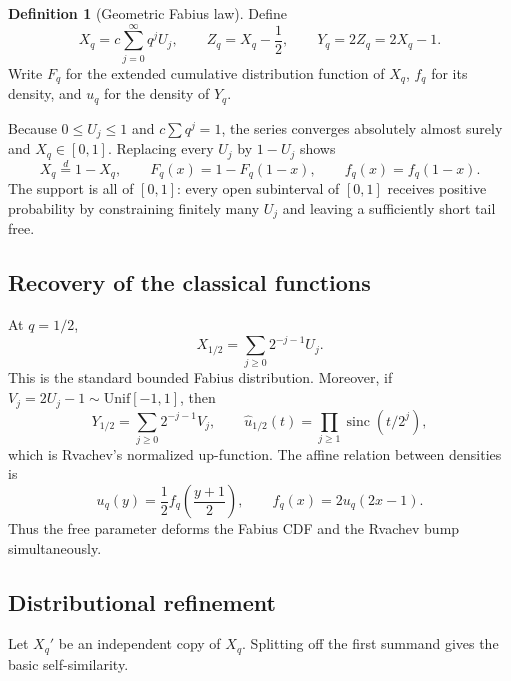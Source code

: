 \documentclass[11pt,oneside]{article}
\theoremstyle{definition}
\newtheorem{definition}[theorem]{Definition}
\theoremstyle{remark}
\newcommand{\sinc}{\operatorname{sinc}}
\begin{document}
\begin{definition}[Geometric Fabius law]
\label{def:qfabius}
Define
\begin{equation}
 X_q=c\sum_{j=0}^{\infty}q^jU_j,
 \qquad
 Z_q=X_q-\frac12,
 \qquad
 Y_q=2Z_q=2X_q-1.                         \label{eq:q-law}
\end{equation}
Write $F_q$ for the extended cumulative distribution function of $X_q$,
$f_q$ for its density, and $u_q$ for the density of $Y_q$.
\end{definition}

Because $0\le U_j\le1$ and $c\sum q^j=1$, the series converges absolutely almost surely and
$X_q\in[0,1]$.  Replacing every $U_j$ by $1-U_j$ shows
\begin{equation}
 X_q\overset d=1-X_q,
 \qquad F_q(x)=1-F_q(1-x),
 \qquad f_q(x)=f_q(1-x).                   \label{eq:symmetry}
\end{equation}
The support is all of $[0,1]$: every open subinterval of $[0,1]$ receives positive
probability by constraining finitely many $U_j$ and leaving a sufficiently short tail free.

\subsection{Recovery of the classical functions}

At $q=1/2$,
\[
 X_{1/2}=\sum_{j\ge0}2^{-j-1}U_j.
\]
This is the standard bounded Fabius distribution.  Moreover, if
$V_j=2U_j-1\sim\mathrm{Unif}[-1,1]$, then
\[
 Y_{1/2}=\sum_{j\ge0}2^{-j-1}V_j,
 \qquad
 \widehat u_{1/2}(t)=\prod_{j\ge1}\sinc(t/2^j),
\]
which is Rvachev's normalized up-function.  The affine relation between densities is
\begin{equation}
 u_q(y)=\frac12 f_q\!\left(\frac{y+1}{2}\right),
 \qquad
 f_q(x)=2u_q(2x-1).                         \label{eq:affine-density}
\end{equation}
Thus the free parameter deforms the Fabius CDF and the Rvachev bump simultaneously.

\subsection{Distributional refinement}

Let $X_q'$ be an independent copy of $X_q$.  Splitting off the first summand gives the basic
self-similarity.
\end{document}

